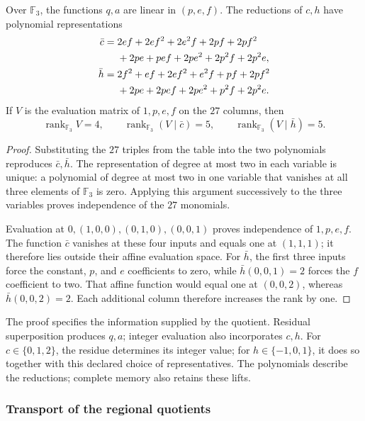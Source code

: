 \begin{theorem}
\label{carry27:rango}
Over \(\mathbb F_3\), the functions \(q,a\) are linear in
\((p,e,f)\). The reductions of \(c,h\) have polynomial
representations
\begin{align}
\bar c={}&2ef+2ef^2+2e^2f+2pf+2pf^2\notag\\
 &+2pe+pef+2pe^2+2p^2f+2p^2e,
\label{carry27:polinomio-c}\\
\bar h={}&2f^2+ef+2ef^2+e^2f+pf+2pf^2\notag\\
 &+2pe+2pef+2pe^2+p^2f+2p^2e.
\label{carry27:polinomio-h}
\end{align}
If \(V\) is the evaluation matrix of \(1,p,e,f\) on the
\(27\) columns, then
\[
\operatorname{rank}_{\mathbb F_3}V=4,\qquad
\operatorname{rank}_{\mathbb F_3}(V\mid\bar c)=5,\qquad
\operatorname{rank}_{\mathbb F_3}(V\mid\bar h)=5.
\]
\end{theorem}

\begin{proof}
Substituting the \(27\) triples from the table into the two
polynomials reproduces \(\bar c,\bar h\). The representation
of degree at most two in each variable is unique: a
polynomial of degree at most two in one variable that vanishes
at all three elements of \(\mathbb F_3\) is zero.
Applying this argument successively to the three variables
proves independence of the \(27\) monomials.

Evaluation at \(0,(1,0,0),(0,1,0),(0,0,1)\) proves
independence of \(1,p,e,f\). The function \(\bar c\)
vanishes at these four inputs and equals one at
\((1,1,1)\); it therefore lies outside their affine
evaluation space. For \(\bar h\), the first three
inputs force the constant, \(p\), and \(e\) coefficients
to zero, while \(\bar h(0,0,1)=2\) forces the
\(f\) coefficient to two. That affine function would
equal one at \((0,0,2)\), whereas
\(\bar h(0,0,2)=2\). Each additional column therefore
increases the rank by one.
\end{proof}

The proof specifies the information supplied by the
quotient. Residual superposition produces \(q,a\);
integer evaluation also incorporates \(c,h\).
For \(c\in\{0,1,2\}\), the residue determines its integer
value; for \(h\in\{-1,0,1\}\), it does so together with
this declared choice of representatives. The polynomials
describe the reductions; complete memory also retains
these lifts.

\subsubsection{Transport of the regional quotients}

